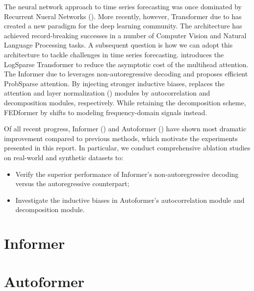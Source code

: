 \documentclass[12pt]{article}
\begin{document}
The neural network approach to time series forecasting was once dominated by Recurrent Nueral Networks (\citet{https://doi.org/10.48550/arxiv.1703.07015}).  
More recently, however, Transformer due to \citet{https://doi.org/10.48550/arxiv.1706.03762} has created a new paradigm for the deep learning community. 
The architecture has achieved record-breaking successes in a number of Computer Vision and Natural Language Processing tasks. 
A subsequent question is how we can adopt this architecture to tackle challenges in time series forecasting. 
\citet{https://doi.org/10.48550/arxiv.1907.00235} introduces the LogSparse Transformer to reduce the asymptotic cost of the multihead attention. 
The Informer due to \citet{https://doi.org/10.48550/arxiv.2012.07436} leverages non-autoregressive decoding and proposes efficient ProbSparse attention. 
By injecting stronger inductive biases, \citet{https://doi.org/10.48550/arxiv.2106.13008} replaces the attention and layer normalization (\citet{https://doi.org/10.48550/arxiv.1607.06450}) modules by autocorrelation and decomposition modules, respectively. 
While retaining the decomposition scheme, FEDformer by \citet{https://doi.org/10.48550/arxiv.2201.12740} shifts to modeling frequency-domain signals instead. 

Of all recent progress, Informer (\citet{https://doi.org/10.48550/arxiv.2012.07436}) and Autoformer (\citet{https://doi.org/10.48550/arxiv.2106.13008}) have shown most dramatic improvement compared to previous methods, which motivate the experiments presented in this report. 
In particular, we conduct comprehensive ablation studies on real-world and synthetic datasets to: \begin{itemize}
    \item Verify the superior performance of Informer's non-autoregressive decoding versus the autoregressive counterpart; 
    \item Investigate the inductive biases in Autoformer's autocorrelation module and decomposition module. 
\end{itemize}


\section{Informer}



\section{Autoformer}

\end{document}
